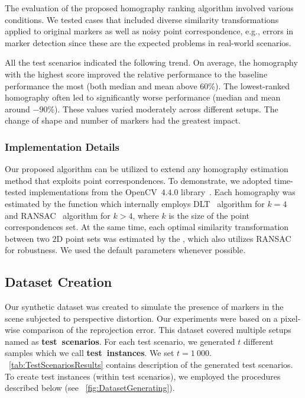 The evaluation of the proposed homography ranking algorithm involved various conditions. We tested cases that included diverse similarity transformations applied to original markers as well as noisy point correspondence, e.g., errors in marker detection since these are the expected problems in real-world scenarios.

All the test scenarios indicated the following trend. On average, the homography with the highest score improved the relative performance to the baseline performance the most (both median and mean above $60$\%). The lowest-ranked homography often led to significantly worse performance (median and mean around $-90$\%). These values varied moderately across different setups. The change of shape and number of markers had the greatest impact.

\subsubsection{Implementation Details}
\label{sssec:HomographyImplementation}

Our proposed algorithm can be utilized to extend any homography estimation method that exploits point correspondences. To demonstrate, we adopted time-tested implementations from the OpenCV~$4.4.0$ library~\cite{bradski2008learning}. Each homography was estimated by the  function which internally employs DLT~\cite{abdel2015direct} algorithm for $k = 4$ and RANSAC~\cite{fischler1981ransac} algorithm for $k > 4$, where $k$ is the size of the point correspondences set. At the same time, each optimal similarity transformation between two $2$D point sets was estimated by the , which also utilizes RANSAC for robustness. We used the default parameters whenever possible.

\subsection{Dataset Creation}
\label{ssec:HomographyDatasetCreation}

Our synthetic dataset was created to simulate the presence of markers in the scene subjected to perspective distortion. Our experiments were based on a pixel-wise comparison of the reprojection error. This dataset covered multiple setups named as \mbox{\textbf{test scenarios}}. For each test scenario, we generated $t$ different samples which we call \mbox{\textbf{test instances}}. We set $t = 1\ 000$. \tablestr{}~\ref{tab:TestScenariosResults} contains description of the generated test scenarios. To create test instances (within test scenarios), we employed the procedures described below (see \figstr{}~\ref{fig:DatasetGenerating}).

